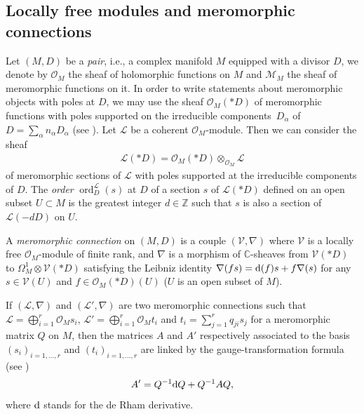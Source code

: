 \documentclass[10pt,a4paper]{amsart}
\numberwithin{equation}{section}
\begin{document}
\subsection{Locally free modules and meromorphic connections}
Let $(M,D)$ be a \textit{pair}, i.e., a complex manifold $M$ equipped with a divisor $D$, we denote by $\mathcal{O}_M$ the sheaf of holomorphic functions on $M$ and $\mathcal{M}_M$ the sheaf of meromorphic functions on it. In order to write statements about meromorphic objects with poles at $D$, we may use the sheaf $\mathcal{O}_M(* D)$ of meromorphic functions with poles supported on the irreducible components~$D_\alpha$ of~$D=\sum_{\alpha} n_\alpha D_\alpha$ (see \cite[p.~17]{Sabbah}). Let $\mathcal{L}$ be a coherent $\mathcal{O}_M$-module. Then we can consider the sheaf
 \begin{gather*}%
 \mathcal{L}(* D) = \mathcal{O}_M(* D)\otimes_{\mathcal{O}_M} \mathcal{L} \end{gather*}
 of meromorphic sections of $\mathcal{L}$ with poles supported at the irreducible components of $D$. The \textit{order} $\operatorname{ord}^\mathcal{L}_D(s)$ at $D$ of a section $s$ of $\mathcal{L}(* D)$ defined on an open subset $U\subset M$ is the greatest integer $d\in \mathbb{Z}$ such that $s$ is also a section of $\mathcal{L}(-d D)$ on $U$.
\begin{Definition}\label{connection} A \textit{meromorphic connection} on $(M,D)$ is a couple $(\mathcal{V},\nabla)$ where $\mathcal{V}$ is a locally free $\mathcal{O}_M$-module of finite rank, and $\nabla$ is a morphism of $\mathbb{C}$-sheaves from $\mathcal{V}(* D)$ to $\Omega^1_M \otimes \mathcal{V}(* D)$ satisfying the Leibniz identity $\nabla(fs) = {\rm d}(f) s + f\nabla(s)$ for any $s\in \mathcal{V}(U)$ and $f\in \mathcal{O}_M(* D)(U)$ ($U$ is an open subset of $M$).
\end{Definition}
If $(\mathcal{L},\nabla)$ and $(\mathcal{L}',\nabla)$ are two meromorphic connections such that $\mathcal{L}= \bigoplus_{i=1}^{r} \mathcal{O}_M s_i$, $\mathcal{L}'= \bigoplus_{i=1}^{r} \mathcal{O}_M t_i$ and $t_i = \sum_{j=1}^{r} q_{ji} s_j$ for a meromorphic matrix $Q$ on $M$, then the matrices $A$ and $A'$ respectively associated to the basis $(s_i)_{i=1,\dots,r}$ and $(t_i)_{i=1,\dots,r}$ are linked by the gauge-transformation formula (see \cite[p.~29]{Sabbah})
\begin{gather*}%
 A' = Q^{-1}{\rm d}Q + Q^{-1}AQ,
\end{gather*}
where ${\rm d}$ stands for the de Rham derivative.
\end{document}
